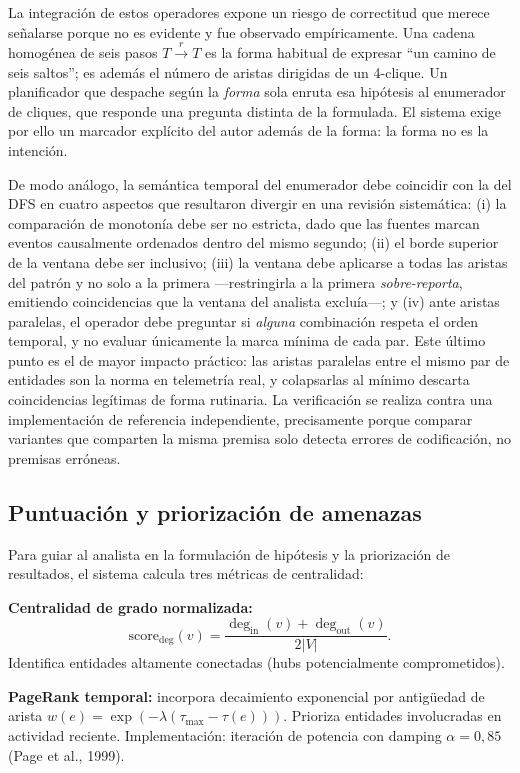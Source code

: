 \documentclass[11pt,a4paper]{article}
\begin{document}
La integración de estos operadores expone un riesgo de correctitud que merece
señalarse porque no es evidente y fue observado empíricamente. Una cadena
homogénea de seis pasos $T \xrightarrow{r} T$ es la forma habitual de expresar
``un camino de seis saltos''; es además el número de aristas dirigidas de un
4-clique. Un planificador que despache según la \emph{forma} sola enruta esa
hipótesis al enumerador de cliques, que responde una pregunta distinta de la
formulada. El sistema exige por ello un marcador explícito del autor además de
la forma: la forma no es la intención.

De modo análogo, la semántica temporal del enumerador debe coincidir con la del
DFS en cuatro aspectos que resultaron divergir en una revisión sistemática:
(i) la comparación de monotonía debe ser no estricta, dado que las fuentes
marcan eventos causalmente ordenados dentro del mismo segundo; (ii) el borde
superior de la ventana debe ser inclusivo; (iii) la ventana debe aplicarse a
todas las aristas del patrón y no solo a la primera ---restringirla a la
primera \emph{sobre-reporta}, emitiendo coincidencias que la ventana del
analista excluía---; y (iv) ante aristas paralelas, el operador debe preguntar
si \emph{alguna} combinación respeta el orden temporal, y no evaluar únicamente
la marca mínima de cada par. Este último punto es el de mayor impacto práctico:
las aristas paralelas entre el mismo par de entidades son la norma en
telemetría real, y colapsarlas al mínimo descarta coincidencias legítimas de
forma rutinaria. La verificación se realiza contra una implementación de
referencia independiente, precisamente porque comparar variantes que comparten
la misma premisa solo detecta errores de codificación, no premisas erróneas.

\subsection{Puntuación y priorización de amenazas}
Para guiar al analista en la formulación de hipótesis y la priorización de
resultados, el sistema calcula tres métricas de centralidad:

\textbf{Centralidad de grado normalizada:}
\[
\mathrm{score}_{\deg}(v) = \frac{\deg_{\mathrm{in}}(v) +
\deg_{\mathrm{out}}(v)}{2|V|}.
\]
Identifica entidades altamente conectadas (hubs potencialmente comprometidos).

\textbf{PageRank temporal:} incorpora decaimiento exponencial por antigüedad de
arista $w(e) = \exp(-\lambda(\tau_{\max} - \tau(e)))$. Prioriza entidades
involucradas en actividad reciente. Implementación: iteración de potencia con
damping $\alpha = 0{,}85$ (Page et al., 1999).
\end{document}
